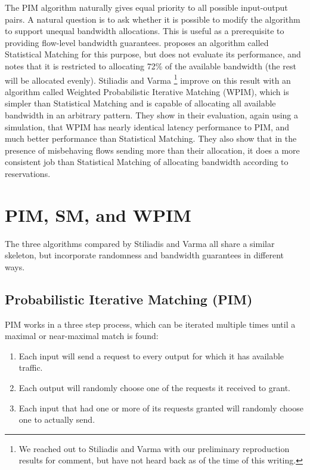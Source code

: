 The PIM algorithm naturally gives equal priority to all possible input-output pairs. A natural question is to ask whether it is possible to modify the algorithm to support unequal bandwidth allocations. This is useful as a prerequisite to providing flow-level bandwidth guarantees. \cite{anderson} proposes an algorithm called Statistical Matching for this purpose, but does not evaluate its performance, and notes that it is restricted to allocating 72\% of the available bandwidth (the rest will be allocated evenly). Stiliadis and Varma \cite{stiliadis}\footnote{We reached out to Stiliadis and Varma with our preliminary reproduction results for comment, but have not heard back as of the time of this writing.} improve on this result with an algorithm called Weighted Probabilistic Iterative Matching (WPIM), which is simpler than Statistical Matching and is capable of allocating all available bandwidth in an arbitrary pattern. They show in their evaluation, again using a simulation, that WPIM has nearly identical latency performance to PIM, and much better performance than Statistical Matching. They also show that in the presence of misbehaving flows sending more than their allocation, it does a more consistent job than Statistical Matching of allocating bandwidth according to reservations.

\section{PIM, SM, and WPIM}
The three algorithms compared by Stiliadis and Varma all share a similar skeleton, but incorporate randomness and bandwidth guarantees in different ways.

\subsection{Probabilistic Iterative Matching (PIM)}
PIM works in a three step process, which can be iterated multiple times until a maximal or near-maximal match is found:

\begin{enumerate}
\item Each input will send a request to every output for which it has available traffic.
\item Each output will randomly choose one of the requests it received to grant.
\item Each input that had one or more of its requests granted will randomly choose one to actually send.
\end{enumerate}

